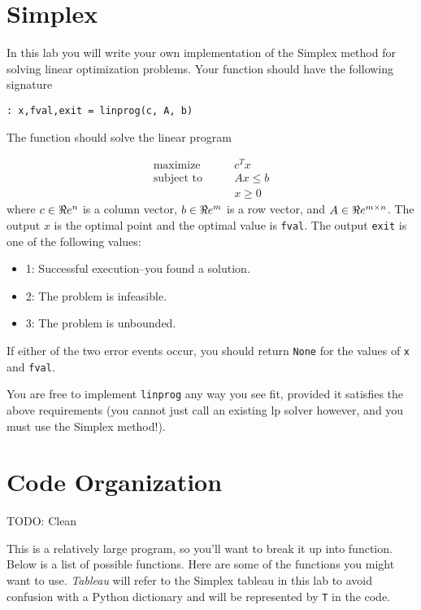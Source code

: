 \label{lab:Simplex}

\section*{Simplex}
In this lab you will write your own implementation of the Simplex method for solving linear optimization problems.
Your function should have the following signature
\begin{lstlisting}
: x,fval,exit = linprog(c, A, b)
\end{lstlisting}
The function should solve the linear program

\begin{align*}
\mbox{maximize}\qquad & c^T x \\
\mbox{subject to}\qquad & A x \leq b \\
 & x \geq 0
\end{align*}
where $c \in \Re e^n$ is a column vector, $b \in \Re e^m$ is a row vector, and $A \in \Re e^{m \times n}$.
The output $x$ is the optimal point and the optimal value is {\tt fval}.
The output {\tt exit} is one of the following values:
\begin{itemize}
	\item 1: Successful execution--you found a solution.
	\item 2: The problem is infeasible.
	\item 3: The problem is unbounded.
\end{itemize}
If either of the two error events occur, you should return {\tt None} for the values of {\tt x} and {\tt fval}.

You are free to implement {\tt linprog} any way you see fit, provided it satisfies the above requirements (you cannot just call an existing lp solver however, and you must use the Simplex method!).

\section*{Code Organization}
TODO: Clean

This is a relatively large program, so you'll want to break it up into function.
Below is a list of possible functions.
Here are some of the functions you might want to use.
\emph{Tableau} will refer to the Simplex tableau in this lab to avoid confusion with a Python dictionary and will be represented by {\tt T}  in the code.

